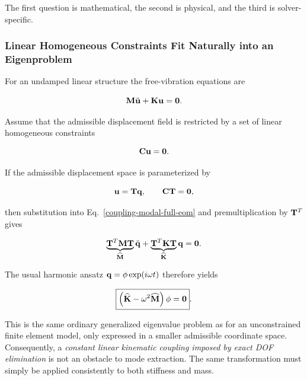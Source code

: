The first question is mathematical, the second is physical, and the third is
solver-specific.

\subsubsection{Linear Homogeneous Constraints Fit Naturally into an Eigenproblem}

For an undamped linear structure the free-vibration equations are

\begin{equation}\label{coupling-modal-full-eom}
    \mathbf{M}\ddot{\mathbf{u}}+\mathbf{K}\mathbf{u}=\mathbf{0}.
\end{equation}

Assume that the admissible displacement field is restricted by a set of linear
homogeneous constraints

\begin{equation}\label{coupling-modal-linear-constraint}
    \mathbf{C}\mathbf{u}=\mathbf{0}.
\end{equation}

If the admissible displacement space is parameterized by

\begin{equation}\label{coupling-modal-nullspace-transform}
    \mathbf{u}=\mathbf{T}\mathbf{q},
    \qquad
    \mathbf{C}\mathbf{T}=\mathbf{0},
\end{equation}

then substitution into Eq.~\eqref{coupling-modal-full-eom} and premultiplication
by $\mathbf{T}^{T}$ gives

\begin{equation}
    \underbrace{\mathbf{T}^{T}\mathbf{M}\mathbf{T}}_{\widehat{\mathbf{M}}}
    \ddot{\mathbf{q}}
    +
    \underbrace{\mathbf{T}^{T}\mathbf{K}\mathbf{T}}_{\widehat{\mathbf{K}}}
    \mathbf{q}=\mathbf{0}.
\end{equation}

The usual harmonic ansatz $\mathbf{q}=\mathbf{\phi}\exp(i\omega t)$ therefore yields

\begin{equation}\label{coupling-modal-reduced-eigenproblem}
    \boxed{
    \left(
    \widehat{\mathbf{K}}-\omega^2\widehat{\mathbf{M}}
    \right)\mathbf{\phi}=\mathbf{0}
    }.
\end{equation}

This is the same ordinary generalized eigenvalue problem as for an unconstrained
finite element model, only expressed in a smaller admissible coordinate space.
Consequently, a \emph{constant linear kinematic coupling imposed by exact DOF
elimination} is not an obstacle to mode extraction. The same transformation must
simply be applied consistently to both stiffness and mass.

